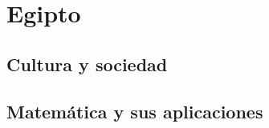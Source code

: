 \documentclass[a4paper,12pt,openany]{article}
\begin{document}
\section*{Egipto}
\subsection*{Cultura y sociedad}


\subsection*{Matemática y sus aplicaciones}

\end{document}
